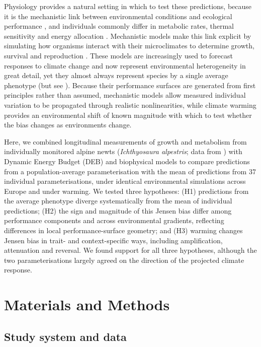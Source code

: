 \documentclass[12pt]{article}
\begin{document}
Physiology provides a natural setting in which to test these predictions, because it is the mechanistic link between environmental conditions and ecological performance \parencite{seebacher2012}, and individuals commonly differ in metabolic rates, thermal sensitivity and energy allocation \parencite{pettersen2024,gvozdik2024}. Mechanistic models make this link explicit by simulating how organisms interact with their microclimates to determine growth, survival and reproduction \parencite{kearney2009,kearney2020c,briscoe2023}. These models are increasingly used to forecast responses to climate change and now represent environmental heterogeneity in great detail, yet they almost always represent species by a single average phenotype (but see \cite{kolbe2010,enriquez-urzelai2020,riddell2022}). Because their performance surfaces are generated from first principles rather than assumed, mechanistic models allow measured individual variation to be propagated through realistic nonlinearities, while climate warming provides an environmental shift of known magnitude with which to test whether the bias changes as environments change.

Here, we combined longitudinal measurements of growth and metabolism from individually monitored alpine newts (\emph{Ichthyosaura alpestris}; data from \cite{baskiera2021}) with Dynamic Energy Budget (DEB) and biophysical models to compare predictions from a population-average parameterisation with the mean of predictions from 37 individual parameterisations, under identical environmental simulations across Europe and under warming. We tested three hypotheses: (H1) predictions from the average phenotype diverge systematically from the mean of individual predictions; (H2) the sign and magnitude of this Jensen bias differ among performance components and across environmental gradients, reflecting differences in local performance-surface geometry; and (H3) warming changes Jensen bias in trait- and context-specific ways, including amplification, attenuation and reversal. We found support for all three hypotheses, although the two parameterisations largely agreed on the direction of the projected climate response.

\section{Materials and Methods}

\subsection{Study system and data}
\end{document}
